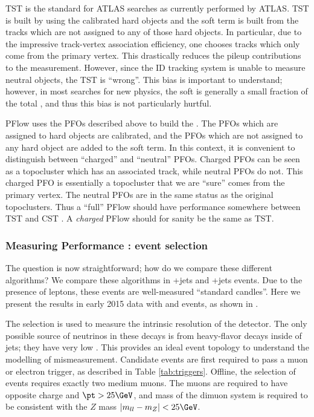 TST \met is the standard for ATLAS searches as currently performed by ATLAS.
TST \met is built by using the calibrated hard objects and the soft term is built from the tracks which are not assigned to any of those hard objects.
In particular, due to the impressive track-vertex association efficiency, one chooses tracks which only come from the primary vertex.
This drastically reduces the pileup contributions to the \met measurement.
However, since the ID tracking system is unable to measure neutral objects, the TST \met is ``wrong''.
This bias is important to understand; however, in most searches for new physics, the soft \met is generally a small fraction of the total \met, and thus this bias is not particularly hurtful.

PFlow \met uses the PFOs described above to build the \met.
The PFOs which are assigned to hard objects are calibrated, and the PFOs which are not assigned to any hard object are added to the soft term.
In this context, it is convenient to distinguish between ``charged'' and ``neutral'' PFOs.
Charged PFOs can be seen as a topocluster which has an associated track, while neutral PFOs do not.
This charged PFO is essentially a topocluster that we are ``sure'' comes from the primary vertex.
The neutral PFOs are in the same status as the original topoclusters.
Thus a ``full'' PFlow \met should have performance somewhere between TST \met and CST \met\footnotemark.
A \textit{charged} PFlow \met should for sanity be the same as TST.


\subsubsection{Measuring \met Performance : event selection}

The question is now straightforward; how do we compare these different algorithms?
We compare these algorithms in \Zll+jets and \Wln+jets events.
Due to the presence of leptons, these events are well-measured ``standard candles''.
Here we present the results in early 2015 data with \Zmm and \Wen events, as shown in \cite{PHYS-PUB-2015-023}.

The \Zll selection is used to measure the intrinsic \met resolution of the detector.
The only possible source of neutrinos in these decays is from heavy-flavor decays inside of jets; they have very low \met.
This provides an ideal event topology to understand the modelling of \met mismeasurement.
Candidate \Zmm events are first required to pass a muon or electron trigger, as described in Table \ref{tab:triggers}.
Offline, the selection of \Zmm events requires exactly two medium muons.
The muons are required to have opposite charge and $\pt > 25 \GeV$, and mass of the dimuon system is required to be consistent with the $Z$ mass $|m_{ll} - m_Z | < 25 \GeV$.

